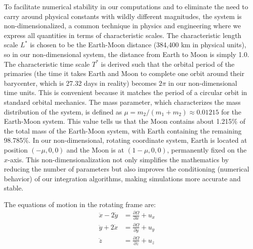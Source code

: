 \documentclass[10pt,letterpaper]{article}
\begin{document}
To facilitate numerical stability in our computations and to eliminate the need to carry around physical constants with wildly different magnitudes, the system is non-dimensionalized, a common technique in physics and engineering where we express all quantities in terms of characteristic scales. The characteristic length scale $L^*$ is chosen to be the Earth-Moon distance (384,400 km in physical units), so in our non-dimensional system, the distance from Earth to Moon is simply 1.0. The characteristic time scale $T^*$ is derived such that the orbital period of the primaries (the time it takes Earth and Moon to complete one orbit around their barycenter, which is 27.32 days in reality) becomes $2\pi$ in our non-dimensional time units. This is convenient because it matches the period of a circular orbit in standard orbital mechanics. The mass parameter, which characterizes the mass distribution of the system, is defined as $\mu = m_2 / (m_1 + m_2) \approx 0.01215$ for the Earth-Moon system. This value tells us that the Moon contains about 1.215\% of the total mass of the Earth-Moon system, with Earth containing the remaining 98.785\%. In our non-dimensional, rotating coordinate system, Earth is located at position $(-\mu, 0, 0)$ and the Moon is at $(1-\mu, 0, 0)$, permanently fixed on the $x$-axis. This non-dimensionalization not only simplifies the mathematics by reducing the number of parameters but also improves the conditioning (numerical behavior) of our integration algorithms, making simulations more accurate and stable.

The equations of motion in the rotating frame are:
\begin{align}
    \ddot{x} - 2\dot{y} &= \frac{\partial \Omega}{\partial x} + u_x \label{eq:cr3bp_x}\\
    \ddot{y} + 2\dot{x} &= \frac{\partial \Omega}{\partial y} + u_y \label{eq:cr3bp_y}\\
    \ddot{z} &= \frac{\partial \Omega}{\partial z} + u_z \label{eq:cr3bp_z}
\end{align}
\end{document}
